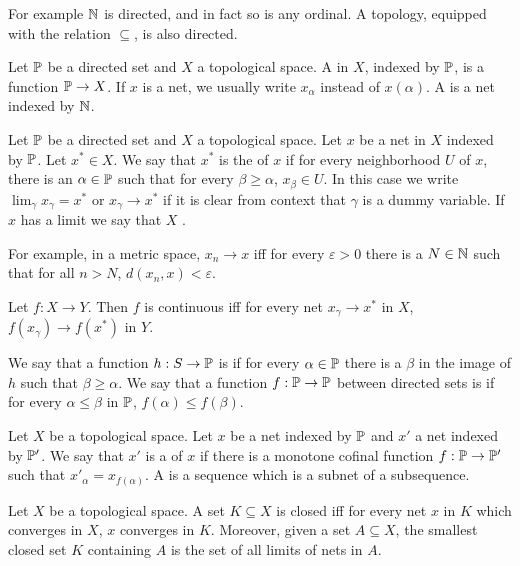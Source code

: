 For example $\mathbb{N}$ is directed, and in fact so is any ordinal. A topology, equipped with the relation $\subseteq$, is also directed.

\begin{definition}
Let $\mathbb{P}$ be a directed set and $X$ a topological space.
A  in $X$, indexed by $\mathbb{P}$, is a function $\mathbb{P} \to X$. If $x$ is a net, we usually write $x_\alpha$ instead of $x(\alpha)$.
A  is a net indexed by $\mathbb{N}$.
\end{definition}

\begin{definition}
Let $\mathbb{P}$ be a directed set and $X$ a topological space. Let $x$ be a net in $X$ indexed by $\mathbb{P}$. Let $x^* \in X$.
We say that $x^*$ is the  of $x$ if for every neighborhood $U$ of $x$, there is an $\alpha \in \mathbb{P}$ such that for every $\beta \geq \alpha$, $x_\beta \in U$.
In this case we write $\lim_\gamma x_\gamma = x^*$ or $x_\gamma \to x^*$ if it is clear from context that $\gamma$ is a dummy variable.
If $x$ has a limit we say that $X$ .
\end{definition}

For example, in a metric space, $x_n \to x$ iff for every $\varepsilon > 0$ there is a $N \in \mathbb{N}$ such that for all $n > N$, $d(x_n, x) < \varepsilon$.

\begin{lemma}
Let $f: X \to Y$. Then $f$ is continuous iff for every net $x_\gamma \to x^*$ in $X$, $f(x_\gamma) \to f(x^*)$ in $Y$.
\end{lemma}

\begin{definition}
We say that a function $h: S \to \mathbb{P}$ is  if for every $\alpha \in \mathbb{P}$ there is a $\beta$ in the image of $h$ such that $\beta \geq \alpha$.
We say that a function $f: \mathbb{P} \to \mathbb{P}$ between directed sets is  if for every $\alpha \leq \beta$ in $\mathbb{P}$, $f(\alpha) \leq f(\beta)$.
\end{definition}

\begin{definition}
Let $X$ be a topological space.
Let $x$ be a net indexed by $\mathbb{P}$ and $x'$ a net indexed by $\mathbb{P}'$.
We say that $x'$ is a  of $x$ if there is a monotone cofinal function $f: \mathbb{P} \to \mathbb{P}'$ such that $x'_\alpha = x_{f(\alpha)}$.
A  is a sequence which is a subnet of a subsequence.
\end{definition}

\begin{lemma}
Let $X$ be a topological space.
A set $K \subseteq X$ is closed iff for every net $x$ in $K$ which converges in $X$, $x$ converges in $K$.
Moreover, given a set $A \subseteq X$, the smallest closed set $K$ containing $A$ is the set of all limits of nets in $A$.
\end{lemma}

